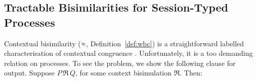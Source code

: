 \subsection{Tractable Bisimilarities for Session-Typed Processes}
\label{subsec:intro:bisimulation}
\noi 
{}
Contextual bisimilarity ($\approx$, Definition~\ref{def:wbc}) is 
a straightforward labelled characterisation of contextual congruence 
\cite{SaWabook}. 
Unfortunately, it is a too demanding relation on processes. 
To see the problem, we show 
the following clause for output.
Suppose $P \,\Re\, Q$, for some context bisimulation $\Re$. Then:

\smallskip 

